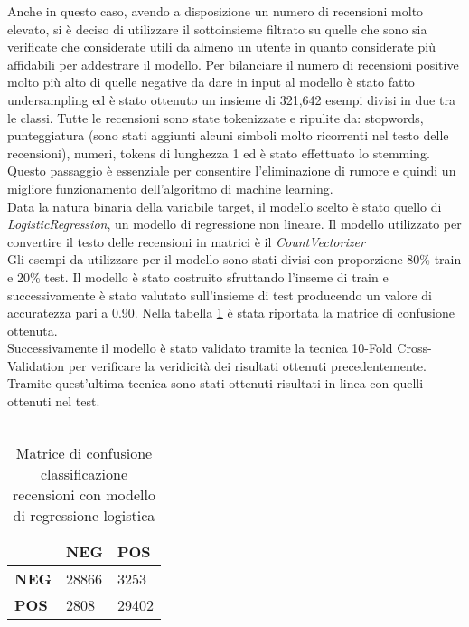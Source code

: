 Anche in questo caso, avendo a disposizione un numero di recensioni molto elevato, si è deciso di utilizzare il sottoinsieme filtrato su quelle che sono sia verificate che considerate utili da almeno un utente in quanto considerate più affidabili per addestrare il modello. Per bilanciare il numero di recensioni positive molto più alto di quelle negative da dare in input al modello è stato fatto undersampling ed è stato ottenuto un insieme di 321,642 esempi divisi in due tra le classi. 
Tutte le recensioni sono state tokenizzate e ripulite da: stopwords, punteggiatura (sono stati aggiunti alcuni simboli molto ricorrenti nel testo delle recensioni), numeri, tokens di lunghezza 1 ed è stato effettuato lo stemming. Questo passaggio è essenziale per consentire l'eliminazione di rumore e quindi un migliore funzionamento dell'algoritmo di machine learning. \\
Data la natura binaria della variabile target, il modello scelto è stato quello di \textit{LogisticRegression}, un modello di regressione non lineare. Il modello utilizzato per convertire il testo delle recensioni in matrici è il \textit{CountVectorizer} \\
Gli esempi da utilizzare per il modello sono stati divisi con proporzione 80\% train e 20\% test. Il modello è stato costruito sfruttando l'inseme di train e successivamente è stato valutato sull'insieme di test producendo un valore di accuratezza pari a 0.90. Nella tabella \ref{tab:matriceConfusioneModello} è stata riportata la matrice di confusione ottenuta. 
\\
Successivamente il modello è stato validato tramite la tecnica 10-Fold Cross-Validation per verificare la veridicità dei risultati ottenuti precedentemente. Tramite quest'ultima tecnica sono stati ottenuti risultati in linea con quelli ottenuti nel test.\\\\
\begin{table}[H]\centering
    \begin{tabular}{l|l|l|}
    \cline{2-3}
     & \textbf{NEG} & \textbf{POS} \\ \hline
    \multicolumn{1}{|l|}{\textbf{NEG}} & 28866 & 3253 \\ \hline
    \multicolumn{1}{|l|}{\textbf{POS}} & 2808 & 29402 \\ \hline
    \end{tabular}
    \caption{Matrice di confusione classificazione recensioni con modello di regressione logistica}
    \label{tab:matriceConfusioneModello}
\end{table}

